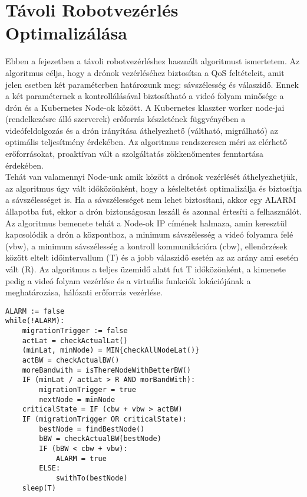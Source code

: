 \chapter{Távoli Robotvezérlés Optimalizálása}
\label{cha:alg}

Ebben a fejezetben a távoli robotvezérléshez használt algoritmust ismertetem. Az algoritmus célja, hogy a drónok vezérléséhez biztosítsa a QoS feltételeit, amit jelen esetben két paraméterben határozunk meg: sávszélesség és válaszidő. Ennek a két paraméternek a kontrollálásával biztosítható a videó folyam minősége a drón és a Kubernetes Node-ok között. A Kubernetes klaszter worker node-jai (rendelkezésre álló szerverek) erőforrás készletének függvényében a videófeldolgozás és a drón irányítása áthelyezhető (váltható, migrálható) az optimális teljesítmény érdekében. Az algoritmus rendszeresen méri az elérhető erőforrásokat, proaktívan vált a szolgáltatás zökkenőmentes fenntartása érdekében. \\

\noindent
Tehát van valamennyi Node-unk amik között a drónok vezérlését áthelyezhetjük, az algoritmus úgy vált időközönként, hogy a késleltetést optimalizálja és biztosítja a sávszélességet is. Ha a sávszélességet nem lehet biztosítani, akkor egy ALARM állapotba fut, ekkor a drón biztonságosan leszáll és azonnal értesíti a felhasználót. \\

\noindent
Az algoritmus bemenete tehát a Node-ok IP címének halmaza, amin keresztül kapcsolódik a drón a központhoz, a minimum sávszélesség a videó folyamra felé (vbw), a minimum sávszélesség a kontroll kommunikációra (cbw), ellenőrzések között eltelt időintervallum (T) és a jobb válaszidő esetén az az arány ami esetén vált (R). Az algoritmus a teljes üzemidő alatt fut T időközönként, a kimenete pedig a videó folyam vezérlése és a virtuális funkciók lokációjának a meghatározása, hálózati erőforrás vezérlése.

\begin{lstlisting}[caption={Az optimalizáló algoritmus}]
ALARM := false
while(!ALARM):
	migrationTrigger := false
	actLat = checkActualLat()
	(minLat, minNode) = MIN{checkAllNodeLat()}
	actBW = checkActualBW()
	moreBandwith = isThereNodeWithBetterBW()
	IF (minLat / actLat > R AND morBandWith):
		migrationTrigger = true
		nextNode = minNode
	criticalState = IF (cbw + vbw > actBW)
	IF (migrationTrigger OR criticalState):
		bestNode = findBestNode()
		bBW = checkActualBW(bestNode)
		IF (bBW < cbw + vbw):
			ALARM = true
		ELSE:
			swithTo(bestNode)
	sleep(T)
\end{lstlisting}

